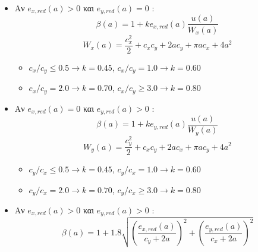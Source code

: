 \begin{itemize}
  \item Αν $e_{x,red}\left(a\right) > 0$ και $e_{y,red}\left(a\right) = 0$ :
  \begin{equation}
  \beta\left(a\right) = 1 + k e_{x,red}\left(a\right)\dfrac{u\left(a\right)}{W_x\left(a\right)}\label{eqn:217}
  \end{equation}
  \begin{equation}
    W_x\left(a\right) = \dfrac{c_x ^2}{2} + c_x c_y + 2 a c_y + \pi a c_x + 4 a^2\label{eqn:218}
  \end{equation}
    \begin{itemize}
      \item $c_x / c_y \leq 0.5 \rightarrow k = 0.45$, $c_x / c_y = 1.0 \rightarrow k = 0.60$
      \item $c_x / c_y = 2.0 \rightarrow k = 0.70$, $c_x / c_y \geq 3.0 \rightarrow k = 0.80$
    \end{itemize}
  \item Αν $e_{x,red}\left(a\right) = 0$ και $e_{y,red}\left(a\right) > 0$ :
  \begin{equation}
  \beta\left(a\right) = 1 + k e_{y,red}\left(a\right)\dfrac{u\left(a\right)}{W_y\left(a\right)}\label{eqn:219}
  \end{equation}
  \begin{equation}
    W_y\left(a\right) = \dfrac{c_y ^2}{2} + c_x c_y + 2 a c_x + \pi a c_y + 4 a^2\label{eqn:220}
  \end{equation}  
    \begin{itemize}
      \item $c_y / c_x \leq 0.5 \rightarrow k = 0.45$, $c_y / c_x = 1.0 \rightarrow k = 0.60$
      \item $c_y / c_x = 2.0 \rightarrow k = 0.70$, $c_y / c_x \geq 3.0 \rightarrow k = 0.80$
    \end{itemize}
  \item Αν $e_{x,red}\left(a\right) > 0$ και $e_{y,red}\left(a\right) > 0$ :
  \begin{equation}
    \beta\left(a\right) = 1 + 1.8 \sqrt{\left(\dfrac{e_{x,red}\left(a\right)}{c_y + 2 a}\right)^2 + \left(\dfrac{e_{y,red}\left(a\right)}{c_x + 2 a}\right)^2}\label{eqn:221}
  \end{equation}
\end{itemize}


